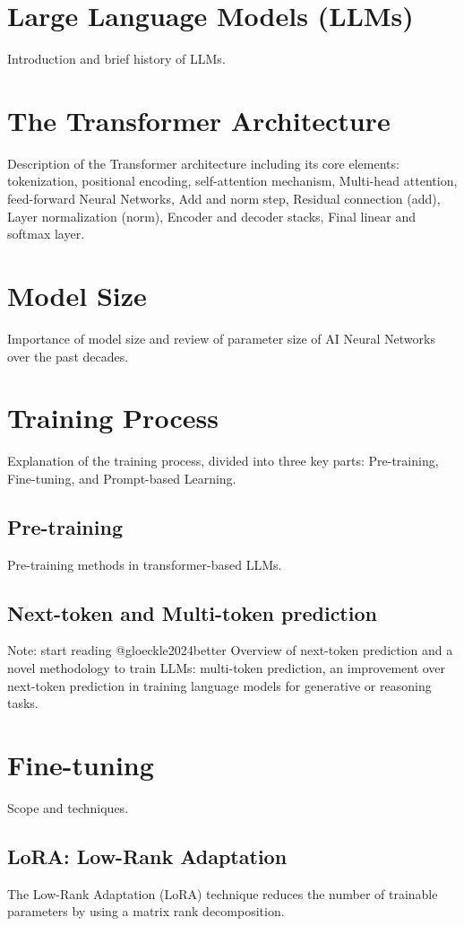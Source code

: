 \section{Large Language Models (LLMs)}
Introduction and brief history of LLMs.

\section{The Transformer Architecture}
Description of the Transformer architecture including its core elements: tokenization, positional encoding, self-attention mechanism, Multi-head attention, feed-forward Neural Networks, Add and norm step, Residual connection (add), Layer normalization (norm), Encoder and decoder stacks, Final linear and softmax layer.

\section{Model Size}
Importance of model size and review of parameter size of AI Neural Networks over the past decades.

\section{Training Process}
Explanation of the training process, divided into three key parts: Pre-training, Fine-tuning, and Prompt-based Learning.

\subsection{Pre-training}
Pre-training methods in transformer-based LLMs.

\subsection{Next-token and Multi-token prediction}
Note: start reading @gloeckle2024better \newline
Overview of next-token prediction and a novel methodology to train LLMs: multi-token prediction, an improvement over next-token prediction in training language models for generative or reasoning tasks. 

\section{Fine-tuning}
Scope and techniques.

\subsection{LoRA: Low-Rank Adaptation}
The Low-Rank Adaptation (LoRA) technique reduces the number of trainable parameters by using a matrix rank decomposition.

